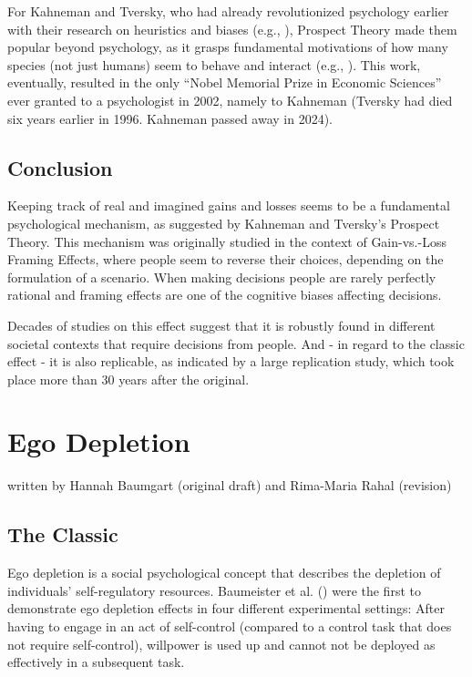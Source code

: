 \documentclass[
  letterpaper,
]{book}
\begin{document}
For Kahneman and Tversky, who had already revolutionized psychology
earlier with their research on heuristics and biases (e.g.,
),
Prospect Theory made them popular beyond psychology, as it grasps
fundamental motivations of how many species (not just humans) seem to
behave and interact (e.g.,
). This work,
eventually, resulted in the only ``Nobel Memorial Prize in Economic
Sciences'' ever granted to a psychologist in 2002, namely to Kahneman
(Tversky had died six years earlier in 1996. Kahneman passed away in
2024).

\section{Conclusion}\label{conclusion-3}

Keeping track of real and imagined gains and losses seems to be a
fundamental psychological mechanism, as suggested by Kahneman and
Tversky's Prospect Theory. This mechanism was originally studied in the
context of Gain-vs.-Loss Framing Effects, where people seem to reverse
their choices, depending on the formulation of a scenario. When making
decisions people are rarely perfectly rational and framing effects are
one of the cognitive biases affecting decisions.

Decades of studies on this effect suggest that it is robustly found in
different societal contexts that require decisions from people. And - in
regard to the classic effect - it is also replicable, as indicated by a
large replication study, which took place more than 30 years after the
original.


\chapter{\texorpdfstring{{Ego
Depletion}}{Ego Depletion}}\label{ego-depletion}

{written by Hannah Baumgart (original draft) and Rima-Maria Rahal
(revision)}

\section{The Classic}\label{the-classic-4}

Ego depletion is a social psychological concept that describes the
depletion of individuals' self-regulatory resources. Baumeister et al.
() were the first to demonstrate ego
depletion effects in four different experimental settings: After having
to engage in an act of self-control (compared to a control task that
does not require self-control), willpower is used up and cannot not be
deployed as effectively in a subsequent task.
\end{document}
